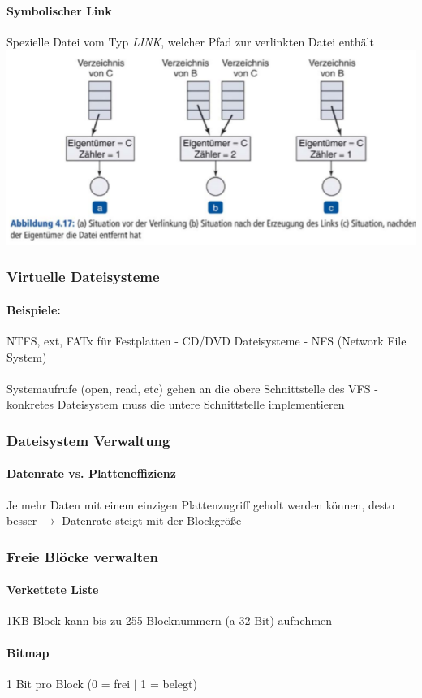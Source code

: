 \documentclass[11pt,a4paper,landscape]{article}
\begin{document}
\begin{multicols*}{3}
	\paragraph{Symbolischer Link} Spezielle Datei vom Typ \textit{LINK}, welcher Pfad zur verlinkten Datei enthält\\
	\includegraphics[width=0.8\columnwidth]{link}
	\subsubsection{Virtuelle Dateisysteme}
	\paragraph{Beispiele:} NTFS, ext, FATx für Festplatten - CD/DVD Dateisysteme - NFS (Network File System)\\\\
	Systemaufrufe (open, read, etc) gehen an die obere Schnittstelle des VFS - konkretes Dateisystem muss die untere Schnittstelle implementieren
	\subsubsection{Dateisystem Verwaltung}
	\paragraph{Datenrate vs. Platteneffizienz} Je mehr Daten mit einem einzigen Plattenzugriff geholt werden können, desto besser $\rightarrow$ Datenrate steigt mit der Blockgröße
	\subsubsection{Freie Blöcke verwalten}
	\paragraph{Verkettete Liste} 1KB-Block kann bis zu 255 Blocknummern (a 32 Bit) aufnehmen
	\paragraph{Bitmap} 1 Bit pro Block (0 = frei $\vert$ 1 = belegt)

\end{multicols*}
\end{document}
